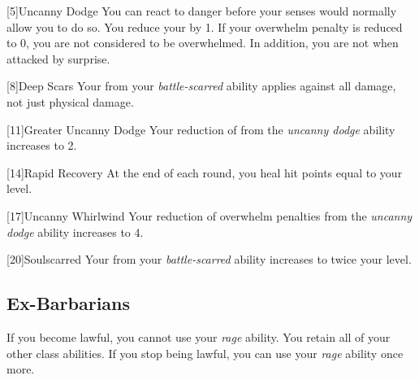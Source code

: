         [5]{Uncanny Dodge} You can react to danger before your senses would normally allow you to do so.
        You reduce your  by 1.
        If your overwhelm penalty is reduced to 0, you are not considered to be overwhelmed.
        In addition, you are not \unaware when attacked by surprise.

        [8]{Deep Scars} Your  from your \textit{battle-scarred} ability applies against all damage, not just physical damage.

        [11]{Greater Uncanny Dodge}
        Your reduction of  from the \textit{uncanny dodge} ability increases to 2.

        [14]{Rapid Recovery}
        At the end of each round, you heal hit points equal to your level.

        [17]{Uncanny Whirlwind}
        Your reduction of overwhelm penalties from the \textit{uncanny dodge} ability increases to 4.

        [20]{Soulscarred}
        Your  from your \textit{battle-scarred} ability increases to twice your level.

    \subsection{Ex-Barbarians}
        If you become lawful, you cannot use your \textit{rage} ability.
        You retain all of your other class abilities.
        If you stop being lawful, you can use your \textit{rage} ability once more.


